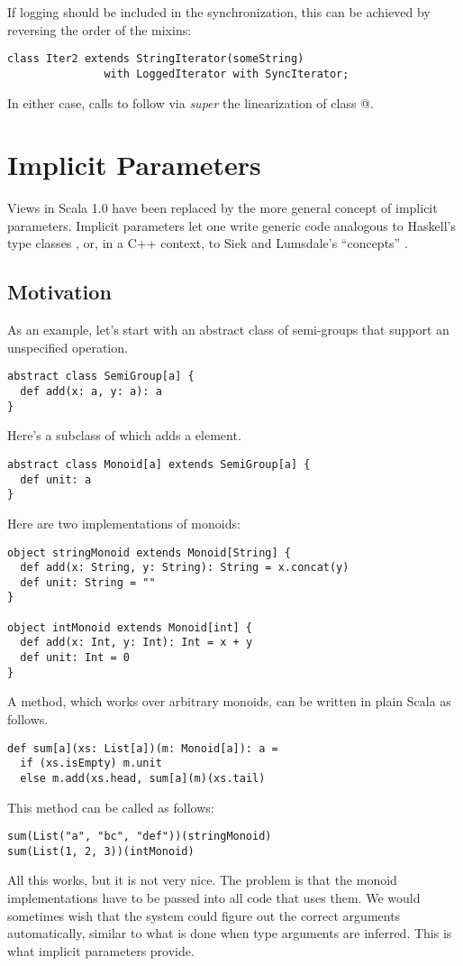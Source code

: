 \documentclass[a4paper,11pt,twoside]{article}
\begin{document}
If logging should be included in the synchronization, this can be
achieved by reversing the order of the mixins:
\begin{lstlisting}
class Iter2 extends StringIterator(someString) 
               with LoggedIterator with SyncIterator;         
\end{lstlisting}
In either case, calls to \lstinline@next@ follow via
{\em super} the linearization of class @.

\section{Implicit Parameters}

Views in Scala 1.0 have been replaced by the more general concept of
implicit parameters. Implicit parameters let one write generic code
analogous to Haskell's type classes \cite{chen-hudak-odersky:parametric-conf}, or, in a C++ context, to Siek and
Lumsdale's ``concepts'' \cite{siek-lumsdaine:pldi05}.

\subsection*{Motivation}

As an example, let's start with an abstract class of semi-groups that
support an unspecified \lstinline@add@ operation.
\begin{lstlisting}
abstract class SemiGroup[a] {
  def add(x: a, y: a): a
}
\end{lstlisting}
Here's a subclass \lstinline@Monoid@ of \lstinline@SemiGroup@ which adds a
\lstinline@unit@ element.
\begin{lstlisting}
abstract class Monoid[a] extends SemiGroup[a] {
  def unit: a
}
\end{lstlisting}
Here are two implementations of monoids:
\begin{lstlisting}
object stringMonoid extends Monoid[String] {
  def add(x: String, y: String): String = x.concat(y)
  def unit: String = ""
}

object intMonoid extends Monoid[int] {
  def add(x: Int, y: Int): Int = x + y
  def unit: Int = 0
}
\end{lstlisting}
A \lstinline@sum@ method, which works over arbitrary
monoids, can be written in plain Scala as follows.
\begin{lstlisting}
def sum[a](xs: List[a])(m: Monoid[a]): a =
  if (xs.isEmpty) m.unit
  else m.add(xs.head, sum[a](m)(xs.tail)
\end{lstlisting}
This \lstinline@sum@ method can be called as follows:
\begin{lstlisting}
sum(List("a", "bc", "def"))(stringMonoid)
sum(List(1, 2, 3))(intMonoid)
\end{lstlisting}
All this works, but it is not very nice. The problem is that the
monoid implementations have to be passed into all code that uses them.
We would sometimes wish that the system could figure out the correct
arguments automatically, similar to what is done when type arguments
are inferred. This is what implicit parameters provide.
\end{document}
